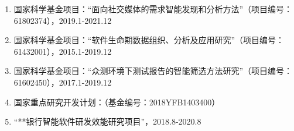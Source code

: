 {
\setlist[enumerate]{}%
\begin{enumerate}[nosep]
    \item 国家科学基金项目：“面向社交媒体的需求智能发现和分析方法”（项目编号：61802374），2019.1-2021.12
    \item 国家科学基金项目：“软件生命期数据组织、分析及应用研究”（项目编号：61432001），2015.1-2019.12
    \item 国家科学基金项目：“众测环境下测试报告的智能筛选方法研究”（项目编号：61602450），2017.1-2019.12
    \item 国家重点研究开发计划：（基金编号：2018YFB1403400）
    \item “**银行智能软件研发效能研究项目”，2018.8-2020.8
\end{enumerate}
}

\cleardoublepage[plain]%

